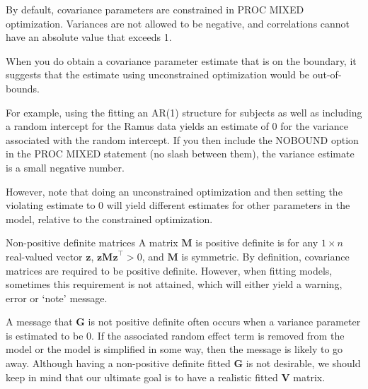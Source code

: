 \documentclass[
  9pt,
  ignorenonframetext,
]{beamer}
\begin{document}
\begin{frame}{}
\protect\hypertarget{section-6}{}
By default, covariance parameters are constrained in PROC MIXED
optimization. Variances are not allowed to be negative, and correlations
cannot have an absolute value that exceeds 1.

When you do obtain a covariance parameter estimate that is on the
boundary, it suggests that the estimate using unconstrained optimization
would be out-of-bounds.

For example, using the fitting an AR(1) structure for subjects as well
as including a random intercept for the Ramus data yields an estimate of
0 for the variance associated with the random intercept. If you then
include the NOBOUND option in the PROC MIXED statement (no slash between
them), the variance estimate is a small negative number.

However, note that doing an unconstrained optimization and then setting
the violating estimate to 0 will yield different estimates for other
parameters in the model, relative to the constrained optimization.
\end{frame}

\begin{frame}{Non-positive definite matrices}
\protect\hypertarget{non-positive-definite-matrices}{}
A matrix \(\pmb M\) is positive definite is for any \(1 \times n\)
real-valued vector \(\pmb z\), \(\pmb {zMz}^{\top} > 0\), and \(\pmb M\)
is symmetric. By definition, covariance matrices are required to be
positive definite. However, when fitting models, sometimes this
requirement is not attained, which will either yield a warning, error or
`note' message.

A message that \(\pmb G\) is not positive definite often occurs when a
variance parameter is estimated to be 0. If the associated random effect
term is removed from the model or the model is simplified in some way,
then the message is likely to go away. Although having a non-positive
definite fitted \(\pmb G\) is not desirable, we should keep in mind that
our ultimate goal is to have a realistic fitted \(\pmb V\) matrix.
\end{frame}
\end{document}
